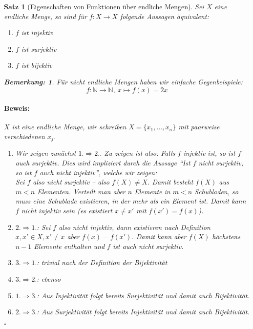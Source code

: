 \documentclass{report}
\newcommand{\N}{\mathbb{N}}
\theoremstyle{customrem}
\newtheorem*{bem}{Bemerkung\textnormal:}
\theoremstyle{customdef}
\newtheorem{satz}[definition]{Satz}
\renewenvironment{proof}{\vspace{-.75cm}\paragraph{Beweis: }}{\vspace{-.5cm}\hfill$\square$}
\begin{document}
	\begin{satz}[Eigenschaften von Funktionen über endliche Mengen]
		Sei $X$ eine endliche Menge, so sind für $f : X \to X$ folgende Aussagen äquivalent:
		\begin{enumerate}
			\itemsep0cm
			\item $f$ ist injektiv 
			\item $f$ ist surjektiv
			\item $f$ ist bijektiv
		\end{enumerate}
		
		\begin{bem}
			Für nicht endliche Mengen haben wir einfache Gegenbeispiele:
			$$f : \N \to \N,\ x \mapsto f(x) = 2x$$
		\end{bem}
		
		\begin{proof}
			$X$ ist eine endliche Menge, wir schreiben $X = \{x_1, \dots, x_n\}$ mit paarweise verschiedenen $x_j$.
			\begin{enumerate}
				\item[i)] Wir zeigen zunächst $1. \Rightarrow 2.$. Zu zeigen ist also: Falls $f$ injektiv ist, so ist $f$ auch surjektiv. Dies wird impliziert durch die Aussage "`Ist $f$ \textit{nicht} surjektiv, so ist $f$ auch \textit{nicht} injektiv"', welche wir zeigen:\\
				Sei $f$ also nicht surjektiv -- also $f(X) \neq X$. Damit besteht $f(X)$ aus $m < n$ Elementen. Verteilt man aber $n$ Elemente in $m < n$ Schubladen, so muss eine Schublade existieren, in der mehr als ein Element ist. Damit kann $f$ nicht injektiv sein (es existiert $x \neq x'$ mit $f(x') = f(x)$).
				\item[ii)] $2. \Rightarrow 1.$: Sei $f$ also nicht injektiv, dann existieren nach Definition $x, x' \in X, x' \neq x$ aber $f(x) = f(x')$. Damit kann aber $f(X)$ höchstens $n-1$ Elemente enthalten und $f$ ist auch nicht surjektiv.
				\item[iii)] $3. \Rightarrow 1.$: trivial nach der Definition der Bijektivität
				\item[iv)] $3. \Rightarrow 2.$: ebenso
				\item[v)] $1. \Rightarrow 3.$: Aus Injektivität folgt bereits Surjektivität und damit auch Bijektivität.
				\item[vi)] $2. \Rightarrow 3.$: Aus Surjektivität folgt bereits Injektivität und damit auch Bijektivität.
			\end{enumerate}
		\end{proof}
	\end{satz}
	
\end{document}
